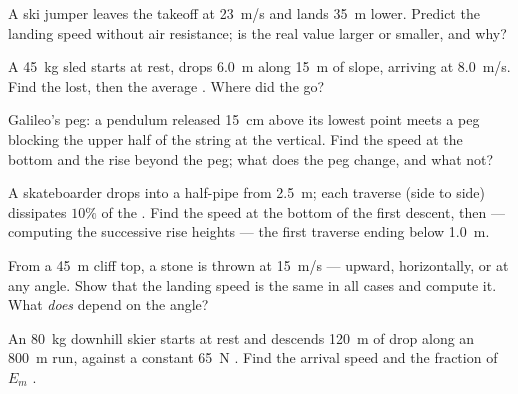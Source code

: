 \begin{exercise}[$\star\star$]\label{exo:g11:mechanical-energy:9}
A ski jumper leaves the takeoff at \qty{23}{m/s} and lands \qty{35}{m}
lower. Predict the landing speed without air resistance; is the real
value larger or smaller, and why?
\end{exercise}

\begin{exercise}[$\star\star$]\label{exo:g11:mechanical-energy:10}
A \qty{45}{kg} sled starts at rest, drops \qty{6.0}{m} along
\qty{15}{m} of slope, arriving at \qty{8.0}{m/s}. Find the  lost, then the average  . Where did the  go?
\end{exercise}

\begin{exercise}[$\star\star$]\label{exo:g11:mechanical-energy:11}
Galileo's peg: a pendulum released \qty{15}{cm} above its lowest point
meets a peg blocking the upper half of the string at the vertical. Find
the speed at the bottom and the rise beyond the peg; what does the peg
change, and what not?
\end{exercise}

\begin{exercise}[$\star\star\star$]\label{exo:g11:mechanical-energy:12}
A skateboarder drops into a half-pipe from \qty{2.5}{m}; each traverse
(side to side) dissipates $10\%$ of the . Find the
speed at the bottom of the first descent, then --- computing the
successive rise heights --- the first traverse ending below \qty{1.0}{m}.
\end{exercise}

\begin{exercise}[$\star\star\star$]\label{exo:g11:mechanical-energy:13}
From a \qty{45}{m} cliff top, a stone is thrown at \qty{15}{m/s} ---
upward, horizontally, or at any angle. Show that the landing speed is the
same in all cases and compute it. What \emph{does} depend on the angle?
\end{exercise}

\begin{exercise}[$\star\star\star$]\label{exo:g11:mechanical-energy:14}
An \qty{80}{kg} downhill skier starts at rest and descends \qty{120}{m}
of drop along an \qty{800}{m} run, against a constant \qty{65}{N}
 . Find the arrival speed and the fraction of $E_m$
.
\end{exercise}

